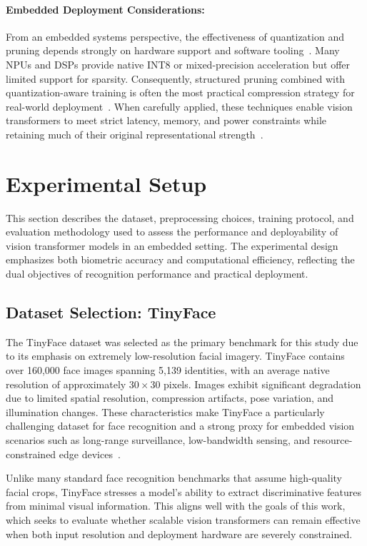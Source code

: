 \documentclass[runningheads,a4paper]{llncs}
\begin{document}
\paragraph{Embedded Deployment Considerations:}
From an embedded systems perspective, the effectiveness of quantization and pruning depends strongly on hardware support and software tooling~\cite{Ngo2025EdgeInference}. Many NPUs and DSPs provide native INT8 or mixed-precision acceleration but offer limited support for sparsity\cite{Roth2024ResourceEff}. Consequently, structured pruning combined with quantization-aware training is often the most practical compression strategy for real-world deployment~\cite{liu2025modelcompression,Jiang2023SingleShot}. When carefully applied, these techniques enable vision transformers to meet strict latency, memory, and power constraints while retaining much of their original representational strength~\cite{Li2023IViT}.

\section{Experimental Setup}\label{sec:experimental}
This section describes the dataset, preprocessing choices, training protocol, and evaluation methodology used to assess the performance and deployability of vision transformer models in an embedded setting. The experimental design emphasizes both biometric accuracy and computational efficiency, reflecting the dual objectives of recognition performance and practical deployment.

\subsection{Dataset Selection: TinyFace}
The TinyFace dataset was selected as the primary benchmark for this study due to its emphasis on extremely low-resolution facial imagery. TinyFace contains over 160,000 face images spanning 5,139 identities, with an average native resolution of approximately $30\times30$ pixels. Images exhibit significant degradation due to limited spatial resolution, compression artifacts, pose variation, and illumination changes. These characteristics make TinyFace a particularly challenging dataset for face recognition and a strong proxy for embedded vision scenarios such as long-range surveillance, low-bandwidth sensing, and resource-constrained edge devices~\cite{cheng2018lowresface}.

Unlike many standard face recognition benchmarks that assume high-quality facial crops, TinyFace stresses a model’s ability to extract discriminative features from minimal visual information. This aligns well with the goals of this work, which seeks to evaluate whether scalable vision transformers can remain effective when both input resolution and deployment hardware are severely constrained.
\end{document}
